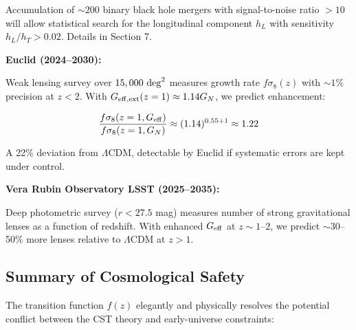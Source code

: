\documentclass[10pt,a4paper]{article}
\begin{document}
Accumulation of \(\sim 200\) binary black hole mergers with
signal-to-noise ratio \(>10\) will allow statistical search for the
longitudinal component \(h_L\) with sensitivity \(h_L/h_T > 0.02\).
Details in Section 7.

\textbf{Euclid (2024--2030):}

Weak lensing survey over \(15,000~{\rm deg}^2\) measures growth rate
\(f\sigma_8(z)\) with \(\sim 1\%\) precision at \(z < 2\). With
\(G_{\rm eff,ext}(z=1) \approx 1.14 G_N\), we predict enhancement:

\[\frac{f\sigma_8(z=1, G_{\rm eff})}{f\sigma_8(z=1, G_N)} \approx (1.14)^{0.55+1} \approx 1.22\]

A 22\% deviation from \(\Lambda\)CDM, detectable by Euclid if systematic
errors are kept under control.

\textbf{Vera Rubin Observatory LSST (2025--2035):}

Deep photometric survey (\(r < 27.5\) mag) measures number of strong
gravitational lenses as a function of redshift. With enhanced
\(G_{\rm eff}\) at \(z \sim 1\)--2, we predict \(\sim 30\)--50\% more
lenses relative to \(\Lambda\)CDM at \(z > 1\).

\subsection{Summary of Cosmological
Safety}\label{summary-of-cosmological-safety}

The transition function \(f(z)\) elegantly and physically resolves the
potential conflict between the CST theory and early-universe
constraints:
\end{document}
